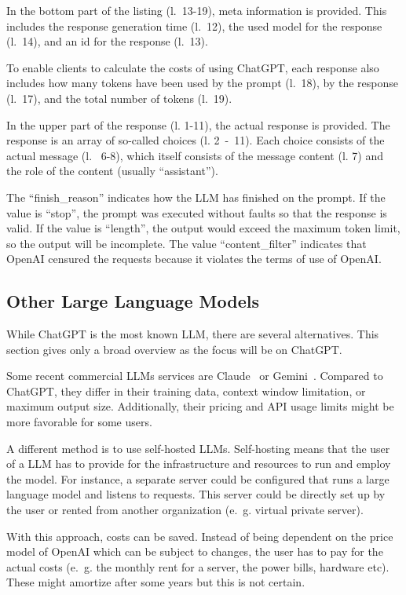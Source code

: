 In the bottom part of the listing (l.~13-19), meta information is provided. This includes the response generation time (l.~12), the used model for the response (l.~14), and an id for the response (l.~13).

To enable clients to calculate the costs of using ChatGPT, each response also includes how many tokens have been used by the prompt (l.~18), by the response (l.~17), and the total number of tokens (l.~19).

In the upper part of the response (l. 1-11), the actual response is provided. The response is an array of so-called choices (l. 2~-~11). Each choice consists of the actual message (l.~ 6-8), which itself consists of the message content (l. 7) and the role of the content (usually \enquote{assistant}).

The \enquote{finish\_reason} indicates how the \ac{LLM} has finished on the prompt. If the value is \enquote{stop}, the prompt was executed without faults so that the response is valid. If the value is \enquote{length}, the output would exceed the maximum token limit, so the output will be incomplete. The value \enquote{content\_filter} indicates that OpenAI censured the requests because it violates the terms of use of OpenAI.~\cite{ChatGPT_url}


\subsection{Other Large Language Models}\label{sec:other_llm}

While ChatGPT is the most known \ac{LLM}, there are several alternatives. This section gives only a broad overview as the focus will be on ChatGPT.

Some recent commercial \acp{LLM} services are Claude~\cite{claude} or Gemini~\cite{gemini}. Compared to ChatGPT, they differ in their training data, context window limitation, or maximum output size. Additionally, their pricing and API usage limits might be more favorable for some users.

A different method  is to use self-hosted \acp{LLM}.
Self-hosting means that the user of a \ac{LLM} has to provide for the infrastructure and resources to run and employ the model. For instance, a separate server could be configured that runs a large language model and listens to requests. This server could be directly set up by the user or rented from another organization (e.~g. virtual private server). 

With this approach, costs can be saved. Instead of being dependent on the price model of OpenAI which can be subject to changes, the user has to pay for the actual costs (e.~g. the monthly rent for a server, the power bills, hardware etc). These might amortize after some years but this is not certain.

